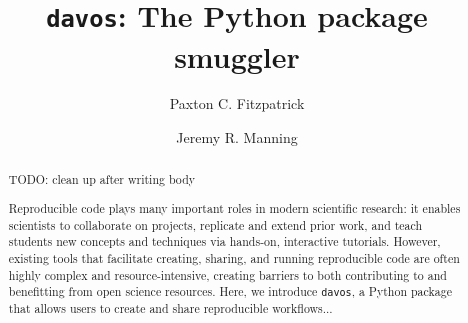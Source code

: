 \documentclass[preprint,12pt, a4paper]{elsarticle}
\begin{document}
\begin{frontmatter}

\title{\texttt{davos}: The Python package smuggler}
\author{Paxton C. Fitzpatrick}
\author{Jeremy R. Manning}
\address{Department of Psychological and Brain Sciences\\Dartmouth College, Hanover, NH 03755}


\begin{abstract}


TODO: clean up after writing body

Reproducible code plays many important roles in modern scientific research: it enables scientists to collaborate on projects, replicate and extend prior work, and teach students new concepts and techniques via hands-on, interactive tutorials.
However, existing tools that facilitate creating, sharing, and running reproducible code are often highly complex and resource-intensive, creating barriers to both contributing to and benefitting from open science resources.
Here, we introduce \texttt{davos}, a Python package that allows users to create and share reproducible workflows...






\end{abstract}
\end{frontmatter}
\end{document}
